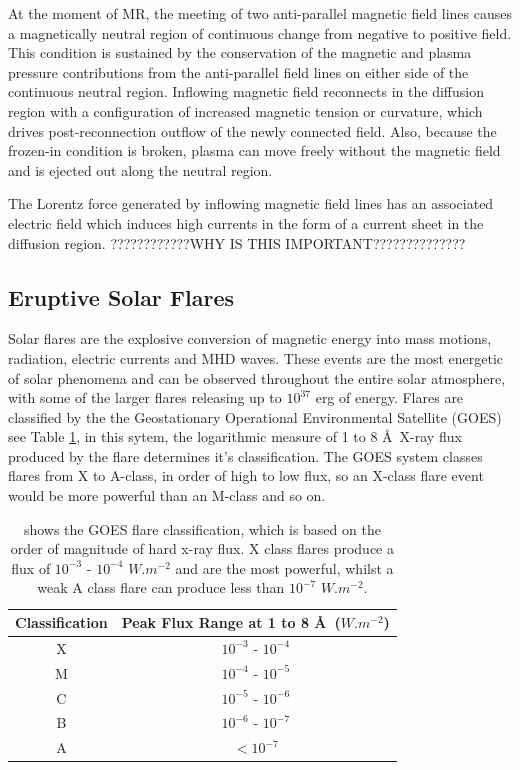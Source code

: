 At the moment of MR, the meeting of two anti-parallel magnetic field lines causes a magnetically neutral region of continuous change from negative to positive field. This condition is sustained by the conservation of the magnetic and plasma pressure contributions from the anti-parallel field lines on either side of the continuous neutral region. Inflowing magnetic field reconnects in the diffusion region with a configuration of increased magnetic tension or curvature, which drives post-reconnection outflow of the newly connected field. Also, because the frozen-in condition is broken, plasma can move freely without the magnetic field and is ejected out along the neutral region.

The Lorentz force generated by inflowing magnetic field lines has an associated electric field which induces high currents in the form of a current sheet in the diffusion region. ????????????WHY IS THIS IMPORTANT?????????????? 



\subsection{Eruptive Solar Flares}\label{flares}

Solar flares are the explosive conversion of magnetic energy into mass motions, radiation, electric currents and MHD waves. These events are the most energetic of solar phenomena and can be observed throughout the entire solar atmosphere, with some of the larger flares releasing up to $10^{37}$ erg of energy. Flares are classified by the the Geostationary Operational Environmental Satellite (GOES) see Table \ref{goes}, in this sytem, the logarithmic measure of 1 to 8 \AA\ X-ray flux produced by the flare determines it's classification. The GOES system classes flares from X to A-class, in order of high to low flux, so an X-class flare event would be more powerful than an M-class and so on. \\

\begin{table}[h]
\centering
\begin{tabular}{|c|c|}\label{GOES}
Classification & Peak Flux Range at 1 to 8 \AA\ ($W.m^{-2}$) \\
\hline
X & $10^{-3}$ - $10^{-4}$\\
M & $10^{-4}$ - $10^{-5}$\\
C & $10^{-5}$ - $10^{-6}$\\
B & $10^{-6}$ - $10^{-7}$\\
A & $<10^{-7}$\\
\end{tabular}
\caption{shows the GOES flare classification, which is based on the order of magnitude of hard x-ray flux. X class flares produce a flux of $10^{-3}$ - $10^{-4}$ $W.m^{-2}$ and are the most powerful, whilst a weak A class flare can produce less than $10^{-7}$ $W.m^{-2}$.}\label{goes}
\end{table}

